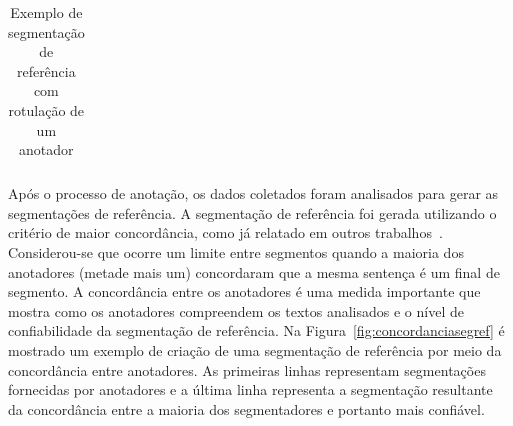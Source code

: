 \begin{table}[!h]
\begin{tabular}{|p{0.2cm}p{}|}




	\end{tabular}
	\caption{Exemplo de segmentação de referência com rotulação de um anotador}
	\label{tab:segmentacaoreferencia}
\end{table}









  
  Após o processo de anotação, os dados coletados foram analisados para gerar as segmentações de referência. A segmentação de referência foi gerada utilizando o critério de maior concordância, como já relatado em outros trabalhos~\cite{Hearst1997, Cardoso2017, Kazantseva2012, Passonneau1997, Galley2003}. Considerou-se que ocorre um limite entre segmentos quando a maioria dos anotadores (metade mais um) concordaram que a mesma sentença é um final de segmento. A concordância entre os anotadores é uma medida importante que mostra como os anotadores compreendem os textos analisados e o nível de confiabilidade da segmentação de referência. Na Figura~\ref{fig:concordanciasegref} é mostrado um exemplo de criação de uma segmentação de referência por meio da concordância entre anotadores. As primeiras linhas representam segmentações fornecidas por anotadores e a última linha representa a segmentação resultante da concordância entre a maioria dos segmentadores e portanto mais confiável. 

